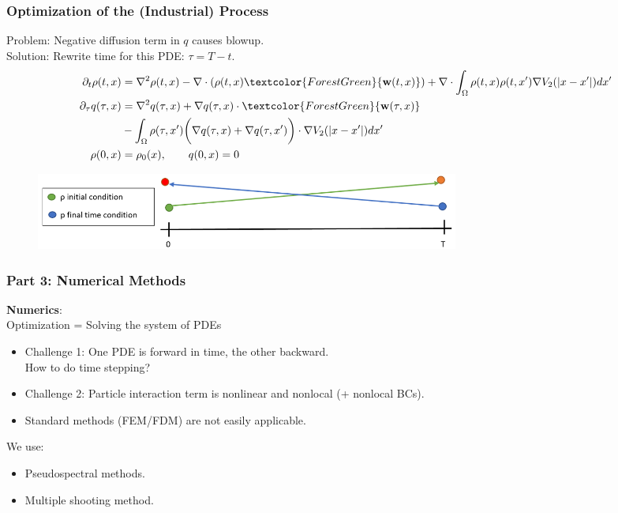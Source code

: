 \documentclass[aspectratio=169,xcolor=dvipsnames]{beamer}
\begin{document}
\begin{frame}
	\frametitle{Optimization of the (Industrial) Process}
     Problem: Negative diffusion term in $q$ causes blowup.\\
     Solution: Rewrite time for this PDE: $\tau = T-t$.
	\begin{align*}
	\partial_t \rho (t,x) &= \nabla^2 \rho (t,x) - \nabla \cdot (\rho(t,x) \textcolor{ForestGreen}{\mathbf{w}(t,x)} )
	+ \nabla \cdot \int_\Omega \rho(t,x) \rho(t,x') \nabla V_2(|x-x'|)dx'  \\
	\partial_\tau q(\tau,x)  &= \nabla^2 q(\tau,x)  + \nabla q(\tau,x)  \cdot \textcolor{ForestGreen}{\mathbf{w}(\tau,x) } \\&- \int_\Omega \rho(\tau, x') \bigg(\nabla q(\tau, x ) + \nabla q(\tau, x')\bigg) \cdot \nabla V_2(|x-x'|)dx' \\
	\rho(0,x)&=\rho_0(x), \qquad q(0,x)= 0 
	\end{align*}
   \begin{figure}
   	\vspace{-0.2cm}
		\includegraphics[width=14cm]{FullSol.png}\\
	\end{figure}
\end{frame}


\begin{frame}
	\frametitle{Part 3: Numerical Methods}
\textbf{Numerics}:\\
 Optimization = Solving the system of PDEs
	\begin{itemize} 
		\item Challenge 1: One PDE is forward in time, the other backward. \\How to do time stepping?
		\item Challenge 2: Particle interaction term is nonlinear and nonlocal (+ nonlocal BCs).
		\item Standard methods (FEM/FDM) are not easily applicable.
	\end{itemize}
We use:
\begin{itemize}
		\item Pseudospectral methods.
		\item Multiple shooting method.
	\end{itemize}
\end{frame}
\end{document}
